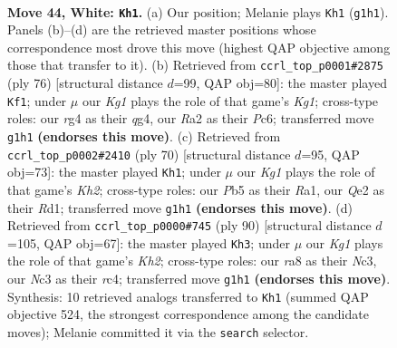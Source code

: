 \documentclass[11pt]{article}
\begin{document}
\clearpage

\begin{figure}[p]\centering
\begin{subfigure}{0.46\textwidth}\centering
\resizebox{\linewidth}{!}{%
\newchessgame
\chessboard[
  setfen={r5k1/3n4/1q1p4/1P2b2p/p5rP/P1N1N3/R3Q3/2R3K1 w - - 1 44},
  showmover=false,
  pgfstyle=straightmove, color=movearrow, markmove={g1-h1}
]}
\caption{}
\end{subfigure}\hfill
\begin{subfigure}{0.46\textwidth}\centering
\resizebox{\linewidth}{!}{%
\newchessgame
\chessboard[
  setfen={2b2rk1/8/p1Pp1n1R/P2P1pp1/1Q1N2q1/8/8/6KR w - - 2 39},
  showmover=false,
  pgfstyle=straightmove, color=movearrow, markmove={g1-f1}
]}
\caption{}
\end{subfigure}
\\[4pt]
\begin{subfigure}{0.46\textwidth}\centering
\resizebox{\linewidth}{!}{%
\newchessgame
\chessboard[
  setfen={1r1r3k/7p/p5p1/1bN1q3/4P3/P4p1B/1P3Q1K/R2R4 w - - 4 36},
  showmover=false,
  pgfstyle=straightmove, color=movearrow, markmove={h2-h1}
]}
\caption{}
\end{subfigure}\hfill
\begin{subfigure}{0.46\textwidth}\centering
\resizebox{\linewidth}{!}{%
\newchessgame
\chessboard[
  setfen={R4rk1/5p2/6p1/Q3p2p/2r1Pq2/2N5/1PP3RK/8 w - - 14 46},
  showmover=false,
  pgfstyle=straightmove, color=movearrow, markmove={h2-h3}
]}
\caption{}
\end{subfigure}
\caption{\textbf{Move 44, White: \texttt{Kh1}.} (a) Our position; Melanie plays \texttt{Kh1} (\texttt{g1h1}). Panels (b)--(d) are the retrieved master positions whose correspondence most drove this move (highest QAP objective among those that transfer to it). (b) Retrieved from \texttt{ccrl\_top\_p0001\#2875} (ply 76) [structural distance $d$=99, QAP obj=80]: the master played \texttt{Kf1}; under $\mu$ our \emph{Kg1} plays the role of that game's \emph{Kg1}; cross-type roles: our \emph{r}g4 as their \emph{q}g4, our \emph{R}a2 as their \emph{P}c6; transferred move \texttt{g1h1} \textbf{(endorses this move)}. (c) Retrieved from \texttt{ccrl\_top\_p0002\#2410} (ply 70) [structural distance $d$=95, QAP obj=73]: the master played \texttt{Kh1}; under $\mu$ our \emph{Kg1} plays the role of that game's \emph{Kh2}; cross-type roles: our \emph{P}b5 as their \emph{R}a1, our \emph{Q}e2 as their \emph{R}d1; transferred move \texttt{g1h1} \textbf{(endorses this move)}. (d) Retrieved from \texttt{ccrl\_top\_p0000\#745} (ply 90) [structural distance $d$=105, QAP obj=67]: the master played \texttt{Kh3}; under $\mu$ our \emph{Kg1} plays the role of that game's \emph{Kh2}; cross-type roles: our \emph{r}a8 as their \emph{N}c3, our \emph{N}c3 as their \emph{r}c4; transferred move \texttt{g1h1} \textbf{(endorses this move)}. Synthesis: 10 retrieved analogs transferred to \texttt{Kh1} (summed QAP objective 524, the strongest correspondence among the candidate moves); Melanie committed it via the \texttt{search} selector.}
\label{fig:thought-m86}
\end{figure}
\end{document}
